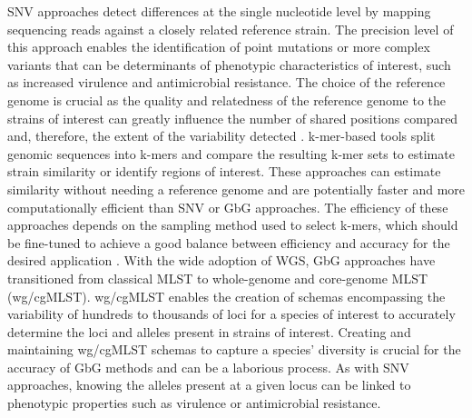 SNV approaches detect differences at the single nucleotide level by mapping sequencing reads against a closely related reference strain. The precision level of this approach enables the identification of point mutations or more complex variants that can be determinants of phenotypic characteristics of interest, such as increased virulence and antimicrobial resistance. The choice of the reference genome is crucial as the quality and relatedness of the reference genome to the strains of interest can greatly influence the number of shared positions compared and, therefore, the extent of the variability detected \citep{bush_genomic_2020, valiente-mullor_one_2021}. k-mer-based tools split genomic sequences into k-mers and compare the resulting k-mer sets to estimate strain similarity or identify regions of interest. These approaches can estimate similarity without needing a reference genome and are potentially faster and more computationally efficient than SNV or GbG approaches. The efficiency of these approaches depends on the sampling method used to select k-mers, which should be fine-tuned to achieve a good balance between efficiency and accuracy for the desired application \citep{ndiaye_when_2024, belbasi_minimizer_2022}. With the wide adoption of WGS, GbG approaches have transitioned from classical MLST to whole-genome and core-genome MLST (wg/cgMLST). wg/cgMLST enables the creation of schemas encompassing the variability of hundreds to thousands of loci for a species of interest to accurately determine the loci and alleles present in strains of interest. Creating and maintaining wg/cgMLST schemas to capture a species' diversity is crucial for the accuracy of GbG methods and can be a laborious process. As with SNV approaches, knowing the alleles present at a given locus can be linked to phenotypic properties such as virulence or antimicrobial resistance.

